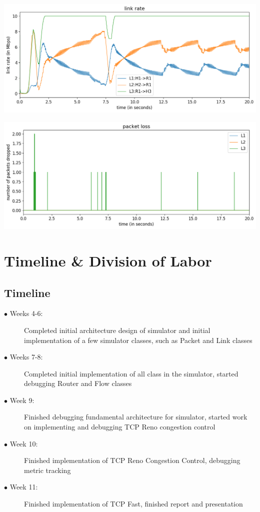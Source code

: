 \documentclass{article}
\begin{document}
\includegraphics[width = \textwidth]{"test_case_custom link rate"}

\includegraphics[width = \textwidth]{"test_case_custom packet loss"}




\section{Timeline \& Division of Labor}

\subsection{Timeline}

\begin{description}
  \item[$\bullet$ Weeks 4-6:] Completed initial architecture design of simulator and initial implementation of a few simulator classes, such as Packet and Link classes
  \item[$\bullet$ Weeks 7-8:] Completed initial implementation of all class in the simulator, started debugging Router and Flow classes 
  \item[$\bullet$ Week 9:] Finished debugging fundamental architecture for simulator, started work on implementing and debugging TCP Reno congestion control
  \item[$\bullet$ Week 10:] Finished implementation of TCP Reno Congestion Control, debugging metric tracking
  \item[$\bullet$ Week 11:] Finished implementation of TCP Fast, finished report and presentation
\end{description}
\end{document}
